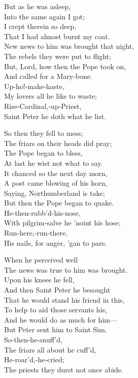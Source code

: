 \settowidth{\versewidth}{New news to him was brought that night,}
\begin{dcverse}\begin{patverse}
But as he was asleep,\\
Into the same again I got;\\
I crept therein so deep,\\
That I had almost burnt my coat.\\
New news to him was brought that night,\\
The rebels they were put to flight;\\
But, Lord, how then the Pope took on,\\
And called for a Mary-bone.\\
Up-ho!-make-haste,\\
My lovers all he like to waste;\\
Rise-Cardinal,-up-Priest,\\
Saint Peter he doth what he list.
\end{patverse}

\begin{patverse}
So then they fell to mess;\\
The friars on their heads did pray;\\
The Pope began to bless,\\
At last he wist not what to say.\\
It chanced so the next day morn,\\
A post came blowing of his horn,\\
Saying, Northumberland is take;\\
But then the Pope began to quake.\\
He-then-rubb’d-his-nose,\\
With pilgrim-salve he ’noint his hose;\\
Run-here,-run-there,\\
His nails, for anger, ’gan to pare.
\end{patverse}

\begin{patverse}
When he perceived well\\
The news was true to him was brought.\\
Upon his knees he fell,\\
And then Saint Peter he besought\\
That he would stand his friend in this,\\
To help to aid those servants his,\\
And he would do as much for him—\\
But Peter sent him to Saint Sim.\\
So-then-he-snuff’d,\\
The friars all about he cuff’d,\\
He-roar’d,-he-cried;\\
The priests they durst not once abide.
\end{patverse}


\end{dcverse}
